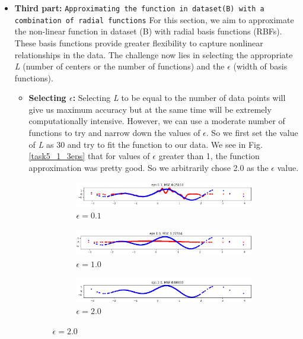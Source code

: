 \begin{itemize}
\item \textbf{Third part: }\texttt{Approximating the function in dataset(B) with a combination of radial functions}
For this section, we aim to approximate the non-linear function in dataset (B) with radial basis functions (RBFs). These basis functions provide greater flexibility to capture nonlinear relationships in the data. The challenge now lies in selecting the appropriate \textit{L} (number of centers or the number of functions) and the $\epsilon$ (width of basis functions). \\
\begin{itemize}
    \item \textbf{Selecting $\epsilon$:}
    Selecting \textit{L} to be equal to the number of data points will give us maximum accuracy but at the same time will be extremely computationally intensive. However, we can use a moderate number of functions to try and narrow down the values of $\epsilon$. So we first set the value of \textit{L} as 30 and try to fit the function to our data. We see in Fig. \ref{task5_1_3eps} that for values of $\epsilon$ greater than 1, the function approximation was pretty good. So we arbitrarily chose 2.0 as the $\epsilon$ value. 
    \begin{figure}[H]
    \centering
    \begin{subfigure}{\textwidth}
        \centering
        \includegraphics[width=0.6\linewidth]{images/epsilon0.1.png}
        \caption{$\epsilon=0.1$}
        \label{epsilon0_1}
    \end{subfigure}
    \begin{subfigure}{\textwidth}
    \centering
        \includegraphics[width=0.6\linewidth]{images/epsilon1.0.png}
        \caption{$\epsilon=1.0$}
        \label{epsilon1}
    \end{subfigure}
    \begin{subfigure}{\textwidth}
    \centering
        \includegraphics[width=0.6\linewidth]{images/epsilon2.0.png}
        \caption{$\epsilon=2.0$}
        \label{epsilon2}

\end{subfigure}
\end{figure}
\end{itemize}
\end{itemize}

